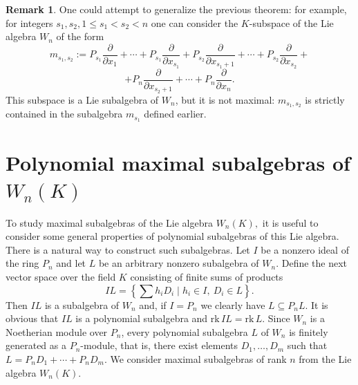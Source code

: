 \documentclass[12pt,a4paper]{amsart}
\theoremstyle{plain}
\theoremstyle{definition}
\newtheorem{remark}{Remark}
\begin{document}
\begin{remark}
	One could  attempt to generalize the previous theorem: for example, 
	for integers $s_1, s_2, 1\leq s_1<s_2<n$ one can consider the $K$-subspace of the Lie algebra $W_n$ of the form
	$$m_{s_1, s_2}:= P_{s_1}\frac{\partial}{\partial x_{1}}+\cdots +P_{s_1}\frac{\partial}{\partial x_{s_1}}+P_{s_2}\frac{\partial}{\partial x_{s_1+1}}+\cdots +P_{s_2}\frac{\partial}{\partial x_{s_2}}+  $$
	$$+P_{n}\frac{\partial}{\partial x_{s_2+1}}+\cdots +P_{n}\frac{\partial}{\partial x_{n}}.  $$
	 This subspace is a Lie subalgebra of $W_n$, but it is not maximal: $ m_{s_1, s_2}$ is strictly contained in the subalgebra $m_{s_1}$ defined earlier.
	
\end{remark}

\section{Polynomial maximal subalgebras of $W_n(K)$}

To study maximal subalgebras of the Lie algebra $W_n(K),$ it is useful to consider some general properties of polynomial subalgebras of
this Lie algebra.
There is a natural way to construct such subalgebras.
Let $I$ be a nonzero ideal of the ring $P_n$ and let $L$ be an arbitrary nonzero subalgebra of $W_n$.
Define the next vector space over the field $K$ consisting of finite sums of products 
\[
IL=\left\{\sum h_i D_i\mid h_i\in I,\ D_i\in L\right\} .
\]
Then $IL$ is a subalgebra of $W_n$ and, if $I=P_n$ we clearly have   $L\subseteq P_nL.$ 
It is obvious that $IL$ is a polynomial subalgebra  and
$\mathrm{rk}\,IL=\mathrm{rk}\,L$.
Since $W_n$ is a Noetherian module over $P_n$, every polynomial subalgebra
$L$ of $W_n$ is finitely generated as a $P_n$-module, that is,  there exist
elements $D_1,\ldots,D_m$ such that $ L=P_n D_1+\cdots+P_n D_m.$ We consider  maximal subalgebras of rank $n$ from the Lie algebra $W_n(K).$ 
\end{document}
